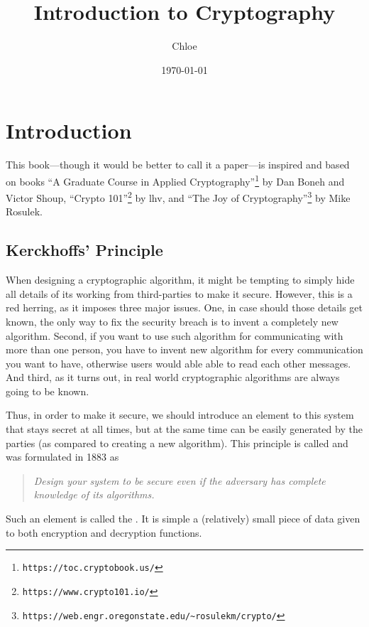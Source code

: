 \documentclass[a4paper,10pt]{article}
\title{Introduction to Cryptography}
\author{Chloe}
\date{\today}
\begin{document}
\maketitle

\tableofcontents

\section*{Introduction}

This book---though it would be better to call it a paper---is inspired and based
on books ``A Graduate Course in Applied Cryptography''\footnote{\verb|https://toc.cryptobook.us/|}
by Dan Boneh and Victor Shoup, ``Crypto 101''\footnote{\verb|https://www.crypto101.io/|}
by lhv, and ``The Joy of Cryptography''\footnote{\verb|https://web.engr.oregonstate.edu/~rosulekm/crypto/|}
by Mike Rosulek.

\subsection*{Kerckhoffs' Principle}
When designing a cryptographic algorithm, it might be tempting to simply hide
all details of its working from third-parties to make it secure. However, this
is a red herring, as it imposes three major issues. One, in case should those
details get known, the only way to fix the security breach is to invent a
completely new algorithm. Second, if you want to use such algorithm for
communicating with more than one person, you have to invent new algorithm for
every communication you want to have, otherwise users would able able to read
each other messages. And third, as it turns out, in real world cryptographic
algorithms are always going to be known.

Thus, in order to make it secure, we should introduce an element to this system
that stays secret at all times, but at the same time can be easily generated by
the parties (as compared to creating a new algorithm). This principle is called
 and was formulated in 1883 as

\begin{quotation}
  \itshape
  Design your system to be secure even if the adversary has complete knowledge
  of its algorithms.
\end{quotation}

Such an element is called the . It is simple a (relatively)
small piece of data given to both encryption and decryption functions.
\end{document}
